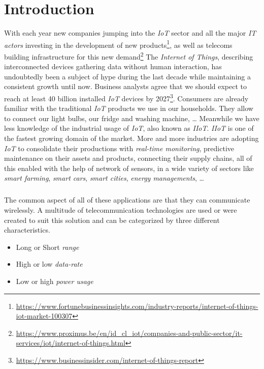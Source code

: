 \chapter{Introduction}

With each year new companies jumping into the \emph{IoT} sector and all the
major \emph{IT actors} investing in the development of new
products\footnote{\url{https://www.fortunebusinessinsights.com/industry-reports/internet-of-things-iot-market-100307}},
as well as telecoms building infrastructure for this new 
demand\footnote{\url{https://www.proximus.be/en/id_cl_iot/companies-and-public-sector/it-services/iot/internet-of-things.html}}
The \emph{Internet of Things}, describing interconnected devices gathering
data without human interaction, has undoubtedly been a subject of hype during the
last decade while maintaining a consistent growth until now.
Business analysts agree that we should expect to reach at least 40 billion
installed \emph{IoT} devices by
2027\footnote{\url{https://www.businessinsider.com/internet-of-things-report}}. 
Consumers are already familiar with the traditional \emph{IoT} products
we use in our households. They allow to connect our light bulbs, our fridge and
washing machine, \ldots
Meanwhile we have less knowledge of the industrial usage of \emph{IoT}, also
known as \emph{IIoT}. \emph{IIoT} is one of the fastest growing domain of the
market. More and more industries are adopting \emph{IoT}  to consolidate their
productions with \emph{real-time monitoring}, predictive maintenance on their
assets and products, connecting their supply chains, all of this enabled with
the help of network of sensors, in a wide variety of
sectors like \emph{smart farming}, \emph{smart cars}, \emph{smart cities},
\emph{energy managements}, \ldots

\paragraph{}

The common aspect of all of these applications are that they can communicate
wirelessly.
A multitude of telecommunication technologies are used or were created to suit
this solution and can be categorized by three different characteristics.

\begin{itemize}
    \item Long or Short \emph{range}
    \item High or low \emph{data-rate}
    \item Low or high \emph{power usage} 
\end{itemize}

